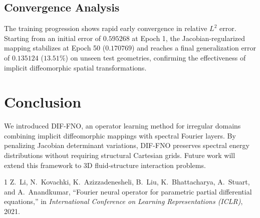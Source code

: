 \documentclass[journal]{IEEEtran}
\begin{document}
\subsection{Convergence Analysis}
The training progression shows rapid early convergence in relative $L^2$ error. Starting from an initial error of $0.595268$ at Epoch 1, the Jacobian-regularized mapping stabilizes at Epoch 50 ($0.170769$) and reaches a final generalization error of $0.135124$ ($13.51\%$) on unseen test geometries, confirming the effectiveness of implicit diffeomorphic spatial transformations.

\section{Conclusion}
We introduced DIF-FNO, an operator learning method for irregular domains combining implicit diffeomorphic mappings with spectral Fourier layers. By penalizing Jacobian determinant variations, DIF-FNO preserves spectral energy distributions without requiring structural Cartesian grids. Future work will extend this framework to 3D fluid-structure interaction problems.

\begin{thebibliography}{1}
Z.~Li, N.~Kovachki, K.~Azizzadenesheli, B.~Liu, K.~Bhattacharya, A.~Stuart, and A.~Anandkumar,
``Fourier neural operator for parametric partial differential equations,''
in \emph{International Conference on Learning Representations (ICLR)}, 2021.
\end{thebibliography}
\end{document}
